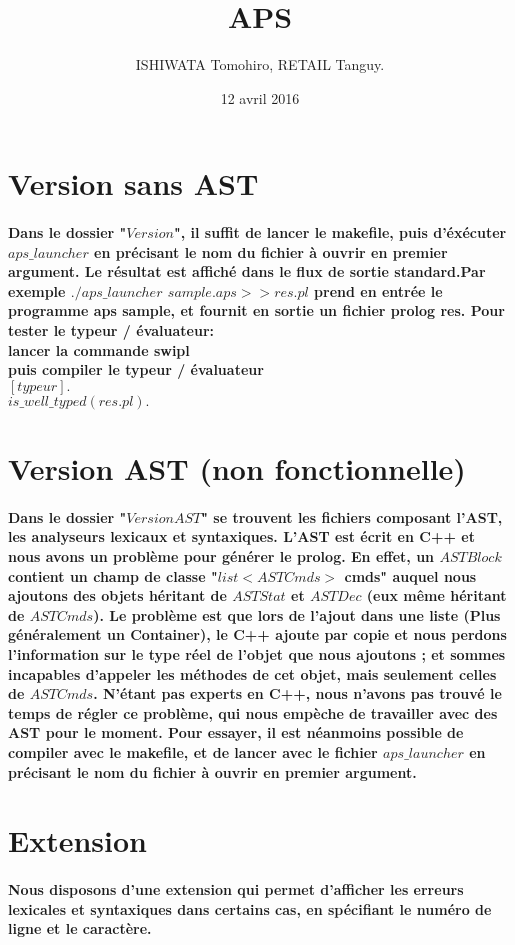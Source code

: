 \documentclass[a4paper, titlepage]{report}
\title{APS}      %
\author{ISHIWATA Tomohiro, RETAIL Tanguy.}           %
\date{12 avril 2016}           %
\begin{document}
\maketitle
\tableofcontents
\section*{Version sans AST}
\paragraph{Dans le dossier "$Version$", il suffit de lancer le makefile, puis d'éxécuter $aps\_launcher$ en précisant le nom du fichier à ouvrir en premier argument. Le résultat est affiché dans le flux de sortie standard.\newline Par exemple $./aps\_launcher$ $sample.aps >> res.pl$ prend en entrée le programme aps sample, et fournit en sortie un fichier prolog res.\newline
Pour tester le typeur / évaluateur: \\
lancer la commande swipl\\
puis compiler le typeur / évaluateur\\
$[typeur].$\\
$is\_well\_typed(res.pl).$}

\section*{Version AST (non fonctionnelle)}
\paragraph{Dans le dossier "$VersionAST$" se trouvent les fichiers composant l'AST, les analyseurs lexicaux et syntaxiques. L'AST est écrit en C++ et nous avons un problème pour générer le prolog. En effet, un $ASTBlock$ contient un champ de classe "$list<ASTCmds>$ cmds" auquel nous ajoutons des objets héritant de $ASTStat$ et $ASTDec$ (eux même héritant de $ASTCmds$). Le problème est que lors de l'ajout dans une liste (Plus généralement un Container), le C++ ajoute par copie et nous perdons l'information sur le type réel de l'objet que nous ajoutons ; et sommes incapables d'appeler les méthodes de cet objet, mais seulement celles de $ASTCmds$.\newline
N'étant pas experts en C++, nous n'avons pas trouvé le temps de régler ce problème, qui nous empèche de travailler avec des AST pour le moment.
\newline
Pour essayer, il est néanmoins possible de compiler avec le makefile, et de lancer avec le fichier $aps\_launcher$ en précisant le nom du fichier à ouvrir en premier argument.}
\section*{Extension}
\paragraph{Nous disposons d'une extension qui permet d'afficher les erreurs lexicales et syntaxiques dans certains cas, en spécifiant le numéro de ligne et le caractère.}
\end{document}
